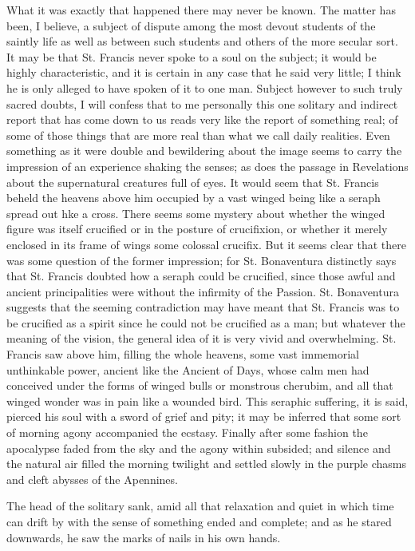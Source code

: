 \documentclass{book}
\begin{document}
What it was exactly that happened there may never be known. The matter has been, I believe, a subject of dispute among the most devout students of the saintly life as well as between such students and others of the more secular sort. It may be that St. Francis never spoke to a soul on the subject; it would be highly characteristic, and it is certain in any case that he said very little; I think he is only alleged to have spoken of it to one man. Subject however to such truly sacred doubts, I will confess that to me personally this one solitary and indirect report that has come down to us reads very like the report of something real; of some of those things that are more real than what we call daily realities. Even something as it were double and bewildering about the image seems to carry the impression of an experience shaking the senses; as does the passage in Revelations about the supernatural creatures full of eyes. It would seem that St. Francis beheld the heavens above him occupied by a vast winged being like a seraph spread out hke a cross. There seems some mystery about whether the winged figure was itself crucified or in the posture of crucifixion, or whether it merely enclosed in its frame of wings some colossal crucifix. But it seems clear that there was some question of the former impression; for St. Bonaventura distinctly says that St. Francis doubted how a seraph could be crucified, since those awful and ancient principalities were without the infirmity of the Passion. St. Bonaventura suggests that the seeming contradiction may have meant that St. Francis was to be crucified as a spirit since he could not be crucified as a man; but whatever the meaning of the vision, the general idea of it is very vivid and overwhelming. St. Francis saw above him, filling the whole heavens, some vast immemorial unthinkable power, ancient like the Ancient of Days, whose calm men had conceived under the forms of winged bulls or monstrous cherubim, and all that winged wonder was in pain like a wounded bird. This seraphic suffering, it is said, pierced his soul with a sword of grief and pity; it may be inferred that some sort of morning agony accompanied the ecstasy. Finally after some fashion the apocalypse faded from the sky and the agony within subsided; and silence and the natural air filled the morning twilight and settled slowly in the purple chasms and cleft abysses of the Apennines.

The head of the solitary sank, amid all that relaxation and quiet in which time can drift by with the sense of something ended and complete; and as he stared downwards, he saw the marks of nails in his own hands.
\end{document}
